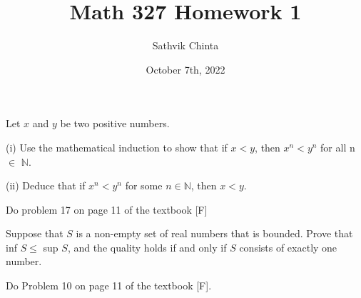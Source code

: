 \documentclass[addpoints]{exam}
\title{Math 327 Homework 1}
\author{Sathvik Chinta}
\date{October 7th, 2022}
\begin{document}
\maketitle

\begin{questions}
\question Let $x$ and $y$ be two positive numbers. 

(i) Use the mathematical induction to show that if $x < y$, then $x^n < y^n$ for all
n $\in$ $\mathbb{N}$.

(ii) Deduce that if $x^n < y^n$ for some $n \in \mathbb{N}$, then $x < y$.

\question Do problem 17 on page 11 of the textbook [F]

\question Suppose that $S$ is a non-empty set of real numbers that is bounded. Prove
that inf $S \leq$ sup $S$, and the quality holds if and only if $S$ consists of exactly
one number.

\question Do Problem 10 on page 11 of the textbook [F].

\end{questions}
\end{document}

